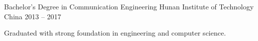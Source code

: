 
\begin{cventries}
  \cventry
    {Bachelor's Degree in Communication Engineering}
    {Hunan Institute of Technology}
    {China}
    {2013 -- 2017}
    {
      \begin{cvitems}
        \item {Graduated with strong foundation in engineering and computer science.}
      \end{cvitems}
    }
\end{cventries}
